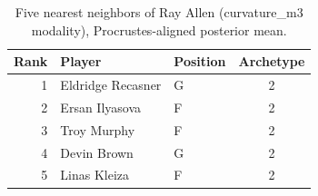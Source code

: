 \begin{table}[htbp]
  \centering\small
  \begin{tabular}{rllc}
    \toprule
    Rank & Player & Position & Archetype \\
    \midrule
    1 & Eldridge Recasner & G & 2 \\
    2 & Ersan Ilyasova & F & 2 \\
    3 & Troy Murphy & F & 2 \\
    4 & Devin Brown & G & 2 \\
    5 & Linas Kleiza & F & 2 \\
    \bottomrule
  \end{tabular}
  \caption{Five nearest neighbors of Ray Allen (curvature_m3 modality), Procrustes-aligned posterior mean.}
  \label{tab:Ray_Allen_neighbors_curvature_m3}
\end{table}


